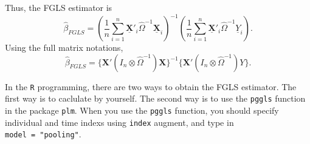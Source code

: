 \documentclass[
  12pt,
]{article}
\begin{document}
Thus, the FGLS estimator is \[
  \hat{\beta}_{FGLS} 
  = \left( \frac{1}{n} \sum_{i=1}^n \underline{\mathbf{X}}'_i \hat{\Omega}^{-1} \underline{\mathbf{X}}_i \right)^{-1}
  \left( \frac{1}{n} \sum_{i=1}^n \underline{\mathbf{X}}'_i \hat{\Omega}^{-1} \underline{Y}_i \right).
\] Using the full matrix notations, \[
  \hat{\beta}_{FGLS}
  = \{ \mathbf{X}'(I_n \otimes \hat{\Omega}^{-1}) \mathbf{X} \}^{-1}
  \{ \mathbf{X}'(I_n \otimes \hat{\Omega}^{-1}) Y \}.
\]

In the \texttt{R} programming, there are two ways to obtain the FGLS
estimator. The first way is to caclulate by yourself. The second way is
to use the \texttt{pggls} function in the package \texttt{plm}. When you
use the \texttt{pggls} function, you should specify individual and time
indexs using \texttt{index} augment, and type in
\texttt{model\ =\ "pooling"}.
\end{document}

